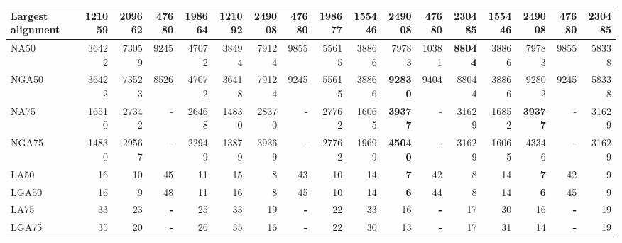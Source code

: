 \documentclass[12pt,a4paper]{article}
\begin{document}
\begin{table}[ht]
\begin{center}
\begin{tabular}{|l*{16}{|r}|}
Largest alignment & 121059 & 209662 & 47680 & 198664 & 121092 & {\bf 249008} & 47680 & 198677 & 155446 & {\bf 249008} & 47680 & 230485 & 155446 & {\bf 249008} & 47680 & 230485 \\ \hline
NA50 & 36422 & 73059 & 9245 & 47072 & 38494 & 79124 & 9855 & 55615 & 38866 & 79783 & 10381 & {\bf 88044} & 38866 & 79783 & 9855 & 58338 \\ \hline
NGA50 & 36422 & 73523 & 8526 & 47072 & 36418 & 79124 & 9245 & 55615 & 38866 & {\bf 92830} & 9404 & 88044 & 38866 & 92802 & 9245 & 58338 \\ \hline
NA75 & 16510 & 27342 & - & 26468 & 14830 & 28370 & - & 27762 & 16065 & {\bf 39377} & - & 31629 & 16852 & {\bf 39377} & - & 31629 \\ \hline
NGA75 & 14830 & 29567 & - & 22949 & 13879 & 39369 & - & 27762 & 19699 & {\bf 45040} & - & 31629 & 16065 & 43346 & - & 31629 \\ \hline
LA50 & 16 & 10 & 45 & 11 & 15 & 8 & 43 & 10 & 14 & {\bf 7} & 42 & 8 & 14 & {\bf 7} & 42 & 9 \\ \hline
LGA50 & 16 & 9 & 48 & 11 & 16 & 8 & 45 & 10 & 14 & {\bf 6} & 44 & 8 & 14 & {\bf 6} & 45 & 9 \\ \hline
LA75 & 33 & 23 & {\bf -} & 25 & 33 & 19 & {\bf -} & 22 & 33 & 16 & {\bf -} & 17 & 30 & 16 & {\bf -} & 19 \\ \hline
LGA75 & 35 & 20 & {\bf -} & 26 & 35 & 16 & {\bf -} & 22 & 30 & 13 & {\bf -} & 17 & 31 & 14 & {\bf -} & 19 \\ \hline
\end{tabular}
\end{center}
\end{table}
\end{document}
